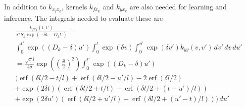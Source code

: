 \documentclass{article}
\newcommand{\erf}{\operatorname{erf}}
\begin{document}
In addition to $k_{x_j x_k}$, kernels $k_{f x_k}$ and $k_{y x_k}$ are
also needed for learning and inference.  The integrals needed to
evaluate these are
\begin{multline}
  \frac{k_{f x_k}(t, t')}{\sigma^2 S_k \exp(-\delta t - D_k t')} =  \\
  \int_0^{t'} \exp((D_k - \delta) u') \int_0^t \exp(\delta v) \int_0^{u'}
  \exp(\delta v') k_{yy}(v, v')\, dv'\, dv\, du' \\
  = 
  \frac{\sqrt{\pi}l}{4\delta}\exp\left(\left(\frac{\delta l}{2}\right)^2\right)
  \int_0^{t'} \exp((D_k - \delta) u') \\
  \bigg(
  \erf(\delta l/2 - t/l)
  + \erf(\delta l/2 - u'/l) - 2 \erf(\delta l/2) \\
  + \exp(2 \delta t) (\erf(\delta l/2 + t/l) - \erf(\delta l/2 +
  (t-u')/l)) \\
  + \exp(2 \delta u') (\erf(\delta l/2 + u'/l) - \erf(\delta l/2
  + (u'-t)/l))
  \bigg)
  \, du' \\

\end{multline}
\end{document}
